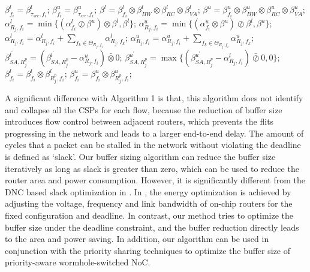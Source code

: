 \documentclass[10pt,journal]{IEEEtran}
\begin{document}
\begin{algorithm}
\begin{algorithmic}[1]
            \ENDIF
        \ENDFOR
        \STATE $\beta_{f_i}^l=\beta_{\tau_{src},f_i}^l$; $\beta_{f_i}^u=\beta_{\tau_{src},f_i}^u$;
                \STATE $\beta^l=\beta^l_{f_i}\otimes\beta_{BW}^l\otimes\beta_{RC}^l\otimes\beta_{VA}^l$;
                \STATE $\beta^u=\beta^u_{f_i}\otimes\beta_{BW}^u\otimes\beta_{RC}^u\otimes\beta_{VA}^u$;
                \STATE $\alpha^l_{R_j,f_i}=\min\{(\alpha^l_{f_i}\oslash\beta^u)\otimes\beta^l,\beta^l\}$;
                \STATE $\alpha^u_{R_j,f_i}=\min\{(\alpha^u_{f_i}\otimes\beta^u)\oslash\beta^l,\beta^u\}$;
                    \STATE $\alpha^l_{R_j,f_i}=\alpha^l_{R_j,f_i}+\sum_{f_k\in\Theta_{R_j,f_i}}\alpha^l_{R_j,f_k}$;
                    \STATE $\alpha^u_{R_j,f_i}=\alpha^u_{R_j,f_i}+\sum_{f_k\in\Theta_{R_j,f_i}}\alpha^u_{R_j,f_k}$;
                    \STATE $\beta^{l^\prime}_{SA,R_j^{p}}=(\beta^{l^\prime}_{SA,R_j^{p}}-\alpha^u_{R_j,f_i})\bar{\otimes}0$;
                    \STATE $\beta^{u^\prime}_{SA,R_j^{p}}=\max\{(\beta^{u^\prime}_{SA,R_j^{p}}-\alpha^l_{R_j,f_i})\bar{\oslash}0,0\}$;
                \ENDIF
            \ENDIF
            \STATE $\beta_{f_i}^l=\beta_{f_i}^l\otimes\beta^l_{R_j^{p},f_i}$; $\beta_{f_i}^u=\beta_{f_i}^u\otimes\beta^u_{R_j^{p},f_i}$;
        \ENDFOR
    \ENDFOR
\end{algorithmic}
\end{algorithm}

A significant difference with Algorithm 1 is that, this algorithm does not identify and collapse all the CSPs for each flow, because the reduction of buffer size introduces flow control between adjacent routers, which prevents the flits progressing in the network and leads to a larger end-to-end delay. The amount of cycles that a packet can be stalled in the network without violating the deadline is defined as `slack'. Our buffer sizing algorithm can reduce the buffer size iteratively as long as slack is greater than zero, which can be used to reduce the router area and power consumption. However, it is significantly different from the DNC based slack optimization in \cite{6560630}. In \cite{6560630}, the energy optimization is achieved by adjusting the voltage, frequency and link bandwidth of on-chip routers for the fixed configuration and deadline. In contrast, our method tries to optimize the buffer size under the deadline constraint, and the buffer reduction directly leads to the area and power saving. In addition, our algorithm can be used in conjunction with the priority sharing techniques \cite{5161497} to optimize the buffer size of priority-aware wormhole-switched NoC.
\end{document}
